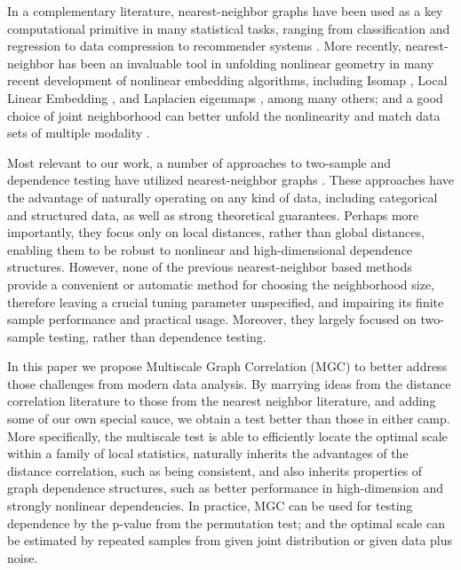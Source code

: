 \documentclass[11pt]{article}
\begin{document}
In a complementary literature, nearest-neighbor graphs have been used as a key computational primitive in many statistical tasks, ranging from classification and regression \cite{Stone1977} to data compression to recommender systems \cite{Sarwar2000}. 
More recently, nearest-neighbor has been an invaluable tool in unfolding nonlinear geometry in many recent development of nonlinear embedding algorithms, including Isomap \cite{TenenbaumSilvaLangford2000, SilvaTenenbaum2003}, Local Linear Embedding \cite{SaulRoweis2000, RoweisSaul2003}, and Laplacien eigenmaps \cite{BelkinNiyogi2003}, among many others; and a good choice of joint neighborhood can better unfold the nonlinearity and match data sets of multiple modality \cite{ShenVogelsteinPriebe2015}.

Most relevant to our work, a number of approaches to two-sample and dependence testing have utilized nearest-neighbor graphs \cite{David1966,Friedman1983,Schilling1986,Dumcke2014}.  These approaches have the advantage of naturally operating on any kind of data, including categorical and structured data, as well as strong theoretical guarantees.  Perhaps more importantly, they focus only on local distances, rather than global distances, enabling them to be robust to nonlinear and high-dimensional dependence structures.  However, none of the previous nearest-neighbor based methods provide a convenient or automatic method for choosing the neighborhood size, therefore leaving a crucial tuning parameter unspecified, and impairing its finite sample performance and practical usage. Moreover, they largely focused on two-sample testing, rather than dependence testing.  

In this paper we propose Multiscale Graph Correlation (MGC) to better address those challenges from modern data analysis. By marrying ideas from the distance correlation literature to those from the nearest neighbor literature, and adding some of our own special sauce, we obtain a test better than those in either camp.  More specifically,  the multiscale test is able to efficiently locate the optimal scale within a family of local statistics, naturally inherits the advantages of the distance correlation, such as being consistent, and also inherits properties of graph dependence structures, such as better performance in high-dimension and strongly nonlinear dependencies. In practice, MGC can be used for testing dependence by the p-value from the permutation test; and the optimal scale can be estimated by repeated samples from given joint distribution or given data plus noise. 
\end{document}
